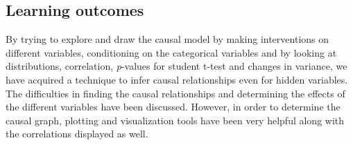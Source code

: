 \documentclass[12pt,fleqn,]{article}
\begin{document}
\begin{multicols}{2}
\section{Learning outcomes} 
	
	
	By trying to explore and draw the causal model by making interventions on different variables, conditioning on the categorical variables and by looking at distributions, correlation, \textit{p}-values for student t-test and changes in variance, we have acquired a technique to infer causal relationships even for hidden variables. The difficulties in finding the causal relationships and determining the effects of the different variables have been discussed. However, in order to determine the causal graph, plotting and visualization tools have been very helpful along with the correlations displayed as well. 
	
\end{multicols}

\newpage
\begin{thebibliography}{9}
	

	
	
	

\end{thebibliography}


\appendix
\end{document}
